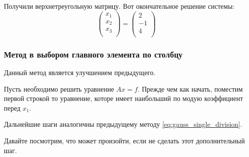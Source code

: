 \documentclass{article}
\begin{document}
\begin{example}
	Получили верхнетреугольную матрицу. Вот окончательное решение системы:
	\[
		\begin{pmatrix}
			x_1 \\
			x_2 \\
			x_3 \\
		\end{pmatrix}
		=
		\begin{pmatrix}
			2 \\
			-1 \\
			4 \\
		\end{pmatrix}
	\]
\end{example}

\subsubsection{Метод в выбором главного элемента по столбцу}
Данный метод является улучшением предыдущего.

\begin{algorithm}
	Пусть необходимо решить уравнение $Ax=f$. Прежде чем как начать,
	поместим первой строкой то уравнение, которе имеет наибольший по модую
	коэффициент перед $x_1$.

	Дальнейшие шаги аналогичны предыдущему методу
	\eqref{eq:gauss_single_division}.
\end{algorithm}

Давайте посмотрим, что может произойти, если не сделать этот дополнительный шаг.
\end{document}
